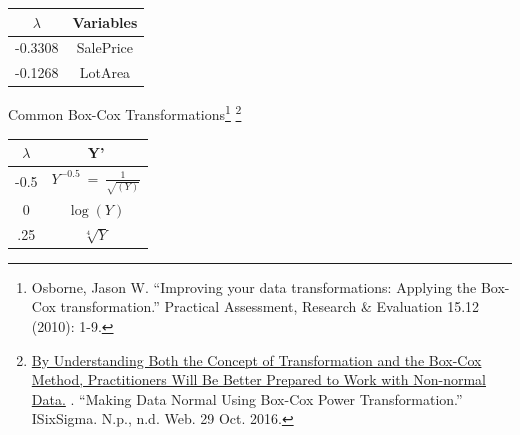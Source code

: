 \documentclass[]{article}
\newenvironment{Shaded}{\begin{snugshade}}{\end{snugshade}}
\newcommand{\KeywordTok}[1]{\textcolor[rgb]{0.13,0.29,0.53}{\textbf{{#1}}}}
\newcommand{\DataTypeTok}[1]{\textcolor[rgb]{0.13,0.29,0.53}{{#1}}}
\newcommand{\DecValTok}[1]{\textcolor[rgb]{0.00,0.00,0.81}{{#1}}}
\newcommand{\CharTok}[1]{\textcolor[rgb]{0.31,0.60,0.02}{{#1}}}
\newcommand{\StringTok}[1]{\textcolor[rgb]{0.31,0.60,0.02}{{#1}}}
\newcommand{\NormalTok}[1]{{#1}}
\let\rmarkdownfootnote\footnote%
\def\footnote{\protect\rmarkdownfootnote}
\begin{document}
\begin{Shaded}
\end{Shaded}

\begin{longtable}[]{@{}cc@{}}
\toprule
\(\lambda\) & Variables\tabularnewline
\midrule
\endhead
-0.3308 & SalePrice\tabularnewline
-0.1268 & LotArea\tabularnewline
\bottomrule
\end{longtable}

\centering

Common Box-Cox Transformations\footnote{Osborne, Jason W. ``Improving
  your data transformations: Applying the Box-Cox transformation.''
  Practical Assessment, Research \& Evaluation 15.12 (2010): 1-9.}
\footnote{\href{https://www.isixsigma.com/tools-templates/normality/making-data-normal-using-box-cox-power-transformation/}{By
  Understanding Both the Concept of Transformation and the Box-Cox
  Method, Practitioners Will Be Better Prepared to Work with Non-normal
  Data.} . ``Making Data Normal Using Box-Cox Power Transformation.''
  ISixSigma. N.p., n.d. Web. 29 Oct. 2016.}

\setlength{\tabcolsep}{12pt}

\begin{tabular}{ c c }
\hline
$\lambda$ & Y' \\ \hline
-0.5 &  $Y^{-0.5}~=~\frac{1}{\sqrt{(Y)}}$ \\
0   & $\log(Y)$ \\
.25  & $\sqrt[4]{Y}$
\end{tabular}
\end{document}
